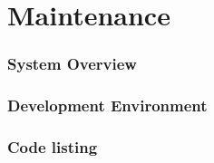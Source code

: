 \part{Maintenance}

\section{System Overview}

\section{Development Environment}

\section{Code listing}


